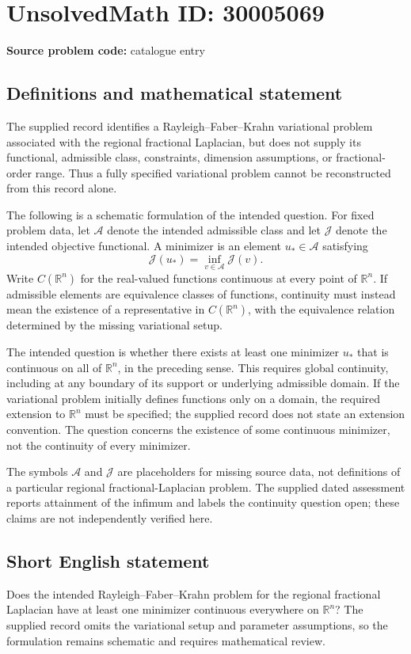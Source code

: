 \documentclass[11pt]{article}
\newcommand{\R}{\mathbb{R}}
\begin{document}
\section*{UnsolvedMath ID: 30005069}
\textbf{Source problem code:} catalogue entry
\subsection{Definitions and mathematical statement}
The supplied record identifies a Rayleigh--Faber--Krahn variational problem associated with the regional fractional Laplacian, but does not supply its functional, admissible class, constraints, dimension assumptions, or fractional-order range. Thus a fully specified variational problem cannot be reconstructed from this record alone.

The following is a schematic formulation of the intended question. For fixed problem data, let \(\mathcal A\) denote the intended admissible class and let \(\mathcal J\) denote the intended objective functional. A minimizer is an element \(u_*\in\mathcal A\) satisfying
\[
\mathcal J(u_*)=\inf_{v\in\mathcal A}\mathcal J(v).
\]
Write \(C(\R^n)\) for the real-valued functions continuous at every point of \(\R^n\). If admissible elements are equivalence classes of functions, continuity must instead mean the existence of a representative in \(C(\R^n)\), with the equivalence relation determined by the missing variational setup.

The intended question is whether there exists at least one minimizer \(u_*\) that is continuous on all of \(\R^n\), in the preceding sense. This requires global continuity, including at any boundary of its support or underlying admissible domain. If the variational problem initially defines functions only on a domain, the required extension to \(\R^n\) must be specified; the supplied record does not state an extension convention. The question concerns the existence of some continuous minimizer, not the continuity of every minimizer.

The symbols \(\mathcal A\) and \(\mathcal J\) are placeholders for missing source data, not definitions of a particular regional fractional-Laplacian problem. The supplied dated assessment reports attainment of the infimum and labels the continuity question open; these claims are not independently verified here.
\subsection{Short English statement}
Does the intended Rayleigh--Faber--Krahn problem for the regional fractional Laplacian have at least one minimizer continuous everywhere on \(\R^n\)? The supplied record omits the variational setup and parameter assumptions, so the formulation remains schematic and requires mathematical review.
\end{document}

